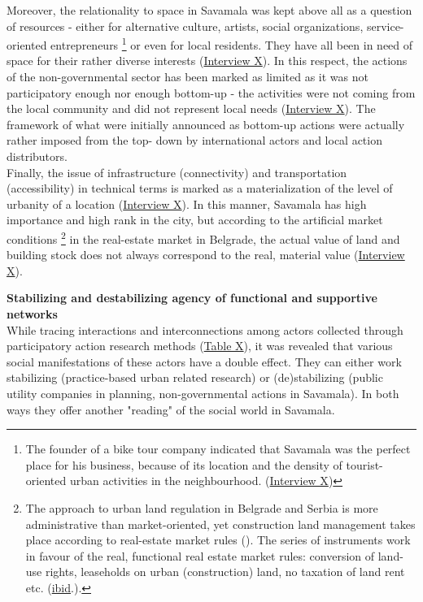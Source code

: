 \documentclass[11pt]{report}
\begin{document}
{{{{Moreover, the relationality to space in Savamala was kept above all as a question of resources - either for alternative culture, artists, social organizations, service-oriented entrepreneurs
\footnote{The founder of a bike tour company indicated that Savamala was the perfect place for his business, because of its location and the density of tourist-oriented urban activities in the neighbourhood. (\href{InterviewX}{Interview X})}
or even for local residents.
They have all been in need of space for their rather diverse interests (\href{InterviewX}{Interview X}).
In this respect, the actions of the non-governmental sector has been marked as limited as it was not  participatory enough nor enough bottom-up - the activities were not coming from the local community and did not represent local needs (\href{InterviewX}{Interview X}).
The framework of what were initially announced as bottom-up actions were actually rather imposed from the top- down by international actors and local action distributors.
\\

Finally, the issue of infrastructure (connectivity) and transportation (accessibility) in technical terms is marked as a materialization of the level of urbanity of a location (\href{InterviewX}{Interview X}).
In this manner, Savamala has high importance and high rank in the city, but according to the artificial market conditions
\footnote{
The approach to urban land regulation in Belgrade and Serbia is more administrative than market-oriented, yet construction land management takes place according to real-estate market rules (\href{Zekovic}{\citealt{zekovic_spatial_2015}}).
The series of instruments work in favour of the real, functional real estate market rules: conversion of land-use rights, leaseholds on urban (construction) land, no taxation of land rent etc. (\href{Zekovic}{ibid}.).}
in the real-estate market in Belgrade, the actual value of land and building stock does not always correspond to the real, material value (\href{InterviewX}{Interview X}).

\textbf{Stabilizing and destabilizing agency of functional and supportive networks}
\\
While tracing interactions and interconnections among actors collected through participatory action research methods (\href{Table 3 Savamala PUD}{Table X}), it was revealed that various social manifestations of these actors have a double effect. They can either work stabilizing (practice-based urban related research) or (de)stabilizing (public utility  companies in planning, non-governmental actions in Savamala). In both ways they offer another  "reading" of the social world in Savamala.
\\

}}}}
\end{document}
